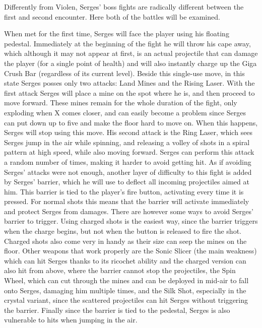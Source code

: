 Differently from Violen, Serges' boss fights are radically different between the first and second encounter. Here both of the battles will be examined.

When met for the first time, Serges will face the player using his floating pedestal. Immediately at the beginning of the fight he will throw his cape away, which although it may not appear at first, is an actual projectile that can damage the player (for a single point of health) and will also instantly charge up the Giga Crush Bar (regardless of its current level). Beside this single-use move, in this state Serges posses only two 
attacks: Land Mines and the Rising Laser. With the first attack Serges will place a mine on the spot where he is, and then proceed to move forward. These mines remain for the whole duration of the fight, only exploding when X comes closer, and can easily become a problem since Serges can put down up to five and make the floor hard to move on. When this happens, Serges will stop using this move. His second attack is the Ring Laser, which sees Serges jump in the air while spinning, and releasing a volley of shots in a spiral pattern at high speed, while also moving forward. Serges can perform this attack a random number of times, making it harder to avoid getting hit. As if avoiding Serges' attacks were not enough, another layer of difficulty to this fight is added by Serges' barrier, which he will use to deflect all incoming projectiles aimed at him. This barrier is tied to the player's fire button, activating every time it is pressed. For normal shots this means that the barrier will activate immediately and protect Serges from damages. There are however some ways to avoid Serges' barrier to trigger. Using charged shots is the easiest way, since the barrier triggers when the charge begins, but not when the button is released to fire the shot. Charged shots also come very in handy as their size can seep the mines on the floor. Other weapons that work properly are the Sonic Slicer (the main weakness) which can hit Serges thanks to its ricochet ability and the charged version can also hit from above, where the barrier cannot stop the projectiles, the Spin Wheel, which can cut through the mines and can be deployed in mid-air to fall onto Serges, damaging him multiple times, and the Silk Shot, especially in the crystal variant, since the scattered projectiles can hit Serges without triggering the barrier. Finally since the barrier is tied to the pedestal, Serges is also vulnerable to hits when jumping in the air.
